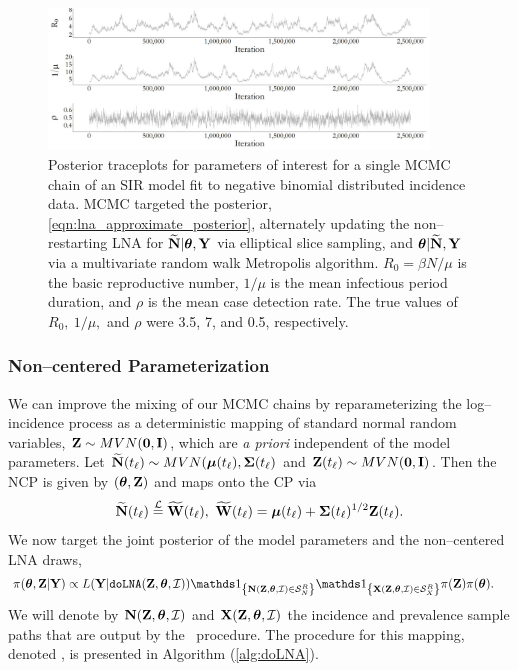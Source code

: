 \begin{figure}[!ht]
\centering
\includegraphics[width=0.9\textwidth]{figures/lna_centered_traces}
\caption[Traceplots for an MCMC chain using a centered LNA parameterization.]{Posterior traceplots for parameters of interest for a single MCMC chain of an SIR model fit to negative binomial distributed incidence data. MCMC targeted the posterior, \ref{eqn:lna_approximate_posterior}, alternately updating the non--restarting LNA for $ \widetilde{\mathbf{N}}|\boldsymbol{\theta},\mathbf{Y} $ via elliptical slice sampling, and $ \boldsymbol{\theta}|\widetilde{\mathbf{N}},\mathbf{Y} $ via a multivariate random walk Metropolis algorithm. $ R_0 = \beta N / \mu$ is the basic reproductive number, $ 1/\mu $ is the mean infectious period duration, and $ \rho $ is the mean case detection rate. The true values of $ R_0,\ 1/\mu,$ and $ \rho $ were 3.5, 7, and 0.5, respectively.}
\label{fig:lna_centered_traces}
\end{figure}

\subsubsection{Non--centered Parameterization}
\label{subsubsec:noncentered_parameterization}	

We can improve the mixing of our MCMC chains by reparameterizing the log--incidence process as a deterministic mapping of standard normal random variables, $ \mathbf{Z}\sim MVN(\boldsymbol{0},\mathbf{I}) $, which are \textit{a priori} independent of the model parameters. Let $ \widetilde{\mathbf{N}}(t_\ell)\sim MVN(\boldsymbol{\mu}(t_\ell),\boldsymbol{\Sigma}(t_\ell) $ and $ \mathbf{Z}(t_\ell)\sim MVN(\boldsymbol{0},\mathbf{I}) $. Then the NCP is given by $ (\boldsymbol{\theta},\mathbf{Z}) $ and maps onto the CP via \begin{align}
\label{eqn:lna_ncp}
 \bNtil(t_\ell) \overset{\mcL}{=}\widetilde{\bW}(t_\ell),\ \widetilde{\bW}(t_\ell) = \bmu(t_\ell) + \bSigma(t_\ell)^{1/2}\bZ(t_\ell).
\end{align} We now target the joint posterior of the model parameters and the non--centered LNA draws,
\begin{align}
\label{eqn:lna_noncentered_posterior}
\pi(\btheta,\bZ|\bY) &\propto L(\bY|\doLNA(\bZ,\btheta,\mcI))\ind{\bN(\bZ,\btheta,\mcI)\in\mcS_N^R}\ind{\bX(\bZ,\btheta,\mcI)\in\mcS_X^R}\pi(\bZ)\pi(\btheta).
\end{align}
We will denote by $ \mathbf{N}(\mathbf{Z},\boldsymbol{\theta},\mathcal{I}) $ and $ \mathbf{X}(\mathbf{Z},\boldsymbol{\theta},\mathcal{I}) $ the incidence and prevalence sample paths that are output by the \doLNA\ procedure. The procedure for this mapping, denoted \doLNA, is presented in Algorithm (\ref{alg:doLNA}). 

